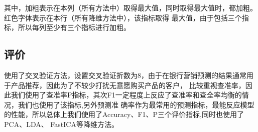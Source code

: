 \documentclass{acm_proc_article-sp}
\begin{document}
\begin{table}[!ht]
\centering
\small
\caption{未均衡实验结果}
\label{WJHSY}
\end{table}
其中，加粗表示在本列（所有方法中）取得最大值，同时取得最大值时，都加粗。红色字体表示在本行（所有降维方法中），该指标取得
最大值，由于包括三个指标，所以每列至少有三个指标进行加粗。

\subsection{\textsf{评价}}

使用了交叉验证方法，设置交叉验证折数为8，由于在银行营销预测的结果通常用于产品推荐，因此为了不较少打扰无意愿购买产品的客户，
比较重视查准率，因此我们使用了查准率P指标，其次F1一定程度上反应了查准率和查全率均衡的情况，我们也使用了该指标,另外预测准
确率作为最常用的预测指标，最能反应模型的性能，所以总体上我们使用了Accuracy、F1、P三个评价指标,同时也使用了PCA、LDA、
FastICA等降维方法。
\end{document}
